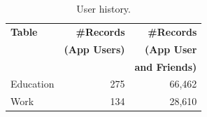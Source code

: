 \begin{table}
\centering
\begin{tabular}{|>{\small}p{2cm}|>{\small}r|>{\small}r|}
\hline
\textbf{Table} & \textbf{\#Records} & \textbf{\#Records} \\
& \textbf{(App Users)} & \textbf{(App User} \\
& & \textbf{and Friends)} \\
\hline
Education & 275 & 66,462 \\
\hline
Work & 134 & 28,610 \\
\hline
\end{tabular}
\caption{User history.}
\label{tab:history}
\end{table}


